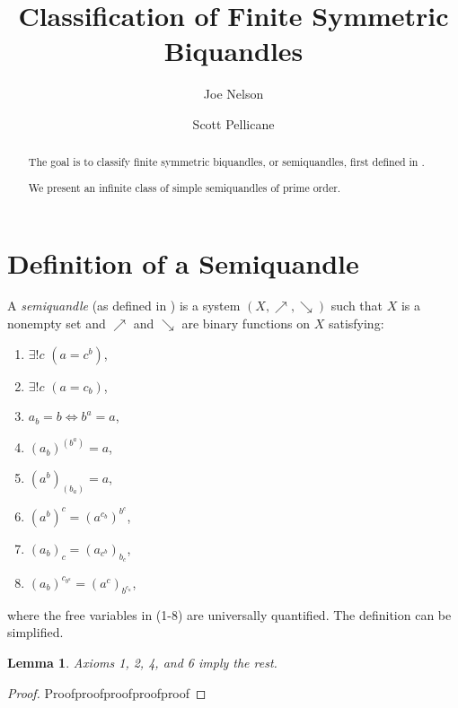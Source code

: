 \documentclass{amsart}
\newtheorem{lem}[thm]{Lemma}
\theoremstyle{definition}
\numberwithin{equation}{section}
\begin{document}
\title{Classification of Finite Symmetric Biquandles}

\author{Joe Nelson}
\author{Scott Pellicane}

\begin{abstract}
The goal is to classify finite symmetric biquandles, or semiquandles, first defined in \cite{aH10}.

We present an infinite class of simple semiquandles of prime order.
\end{abstract}

\maketitle


\section{Definition of a Semiquandle}

A \emph{semiquandle} (as defined in \cite{aH10}) is a system
$(X,\nearrow,\searrow)$ such that $X$ is a nonempty set and $\nearrow$
and $\searrow$ are binary functions on $X$ satisfying:

\begin{enumerate}
\item $\exists!{c}$ $(a = c^b)$,
\item $\exists!{c}$ $(a = c_b)$,
\item $a_b = b \Leftrightarrow b^a = a$,
\item $(a_b)^{(b^a)} = a$,
\item $(a^b)_{(b_a)} = a$,
\item $(a^b)^c = (a^{c_b})^{b^c}$,
\item $(a_b)_c = (a_{c^b})_{b_c}$,
\item $(a_b)^{c_{b^a}} = (a^c)_{b^{c_a}}$,
\end{enumerate}

where the free variables in (1-8) are universally quantified. The
definition can be simplified.

\begin{lem}
Axioms 1, 2, 4, and 6 imply the rest.
\end{lem}

\begin{proof}
Proofproofproofproofproof
\end{proof}
\end{document}
